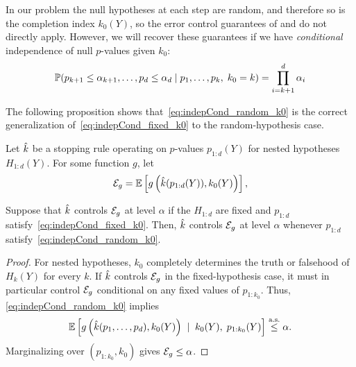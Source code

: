 \documentclass{article}
\begin{document}
In our problem the null hypotheses at each step are random, and therefore so is the completion index $k_0(Y)$, so the error control guarantees of \citet{gsell2013sequential} and \citet{li2015accumulation} do not directly apply. However, we will recover these guarantees if we have {\em conditional} independence of null $p$-values given $k_0$:
\begin{equation}\label{eq:indepCond_random_k0}
  \P(p_{k+1} \leq \alpha_{k+1}, \ldots, p_d \leq \alpha_d
  \mid p_1, \ldots, p_k, \; k_0 = k) = \prod_{i=k+1}^d \alpha_i
\end{equation}

The following proposition shows that~\eqref{eq:indepCond_random_k0} is the correct generalization of~\eqref{eq:indepCond_fixed_k0} to the random-hypothesis case.
\begin{proposition}
  Let $\hk$ be a stopping rule operating on $p$-values $p_{1:d}(Y)$ for nested hypotheses $H_{1:d}(Y)$. For some function $g$, let
  \[
  \Err_g = \E\left[ g\left(\hk(p_{1:d}(Y)), k_0(Y)\right)\right],
  \]
  
  Suppose that $\hk$ controls $\Err_g$ at level $\alpha$ if the $H_{1:d}$ are fixed and $p_{1:d}$ satisfy~\eqref{eq:indepCond_fixed_k0}. Then, $\hk$ controls $\Err_g$ at level $\alpha$ whenever $p_{1:d}$ satisfy~\eqref{eq:indepCond_random_k0}.
\end{proposition}
\begin{proof}
    For nested hypotheses, $k_0$ completely determines the truth or falsehood of $H_k(Y)$ for every $k$. If $\hk$ controls $\Err_g$ in the 
fixed-hypothesis case, it must in particular control $\Err_g$ conditional on any fixed values of $p_{1:k_0}$. Thus, \eqref{eq:indepCond_random_k0} implies
  \[
  \E\left[ g\left(\hk(p_1,\ldots,p_d), k_0(Y)\right) \;\mid\;
      k_0(Y), \; p_{1:k_0}(Y)\right] \leqAS \alpha.
  \]
  Marginalizing over $(p_{1:k_0},k_0)$ gives $\Err_g\leq \alpha$.
\end{proof}

\end{document}
